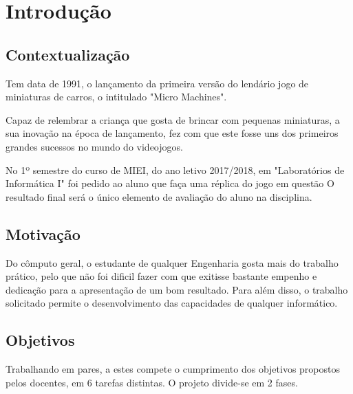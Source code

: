 \documentclass[a4paper]{report} %
\begin{document}
\rhead{\leftmark} %
 
\lfoot{} %
 
\cfoot{\thepage} %
\rfoot{} %
\maketitle

\tableofcontents

\listoffigures

\listoftables

\chapter{Introdução}
\section{Contextualização}

    Tem data de 1991, o lançamento da primeira versão do lendário jogo de 
    miniaturas de carros, o intitulado "Micro Machines".
    
    Capaz de relembrar a criança que gosta de brincar com pequenas miniaturas, a sua inovação na época de lançamento, fez com que este fosse uns dos primeiros grandes sucessos no mundo do videojogos.
    
    No 1º semestre do curso de MIEI, do ano letivo 2017/2018, em "Laboratórios de Informática I" foi pedido ao aluno que faça uma réplica do jogo em questão
    O resultado final será o único elemento de avaliação do aluno na disciplina. 
    
  
 \section{Motivação}
    
    Do cômputo geral, o estudante de qualquer Engenharia gosta mais do trabalho prático, pelo que não foi dificil fazer com que exitisse bastante empenho e dedicação para a apresentação de um bom resultado.
    Para além disso, o trabalho solicitado permite o desenvolvimento das capacidades de qualquer informático.

 \newpage
  
 
 \section{Objetivos}
    
    Trabalhando em pares, a estes compete o cumprimento dos objetivos propostos pelos docentes, em 6 tarefas distintas.
    O projeto divide-se em 2 fases. 
    
\end{document}

